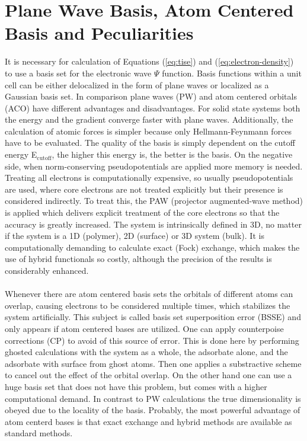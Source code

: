 \documentclass[11pt,DIV=13,BCOR=5mm,a4paper,headinclude]{scrbook}
\begin{document}
\section{Plane Wave Basis, Atom Centered Basis and Peculiarities}
It is necessary for calculation of Equations (\ref{eq:tise}) and (\ref{eq:electron-density}) to use a basis set for the electronic wave $\Psi$ function.
Basis functions within a unit cell can be either delocalized in the form of plane waves or localized as a Gaussian basis set.
In comparison plane waves (PW) and atom centered orbitals (ACO) have different advantages and disadvantages\cite{Tosoni2007}.
For solid state systems both the energy and the gradient converge faster with plane waves.
Additionally, the calculation of atomic forces is simpler because only Hellmann-Feynmann forces have to be evaluated.
The quality of the basis is simply dependent on the cutoff energy E$_\textrm{cutoff}$, the higher this energy is, the better is the basis.
On the negative side, when norm-conserving pseudopotentials are applied more memory is needed.
Treating all electrons is computationally expensive, so usually pseudopotentials are used, where core electrons are not treated explicitly but their presence is considered indirectly.
To treat this, the PAW\cite{paw1,Kresse1999} (projector augmented-wave method) is applied which delivers explicit treatment of the core electrons so that the accuracy is greatly increased.
The system is intrinsically defined in 3D, no matter if the system is a 1D (polymer), 2D (surface) or 3D system (bulk).
It is computationally demanding to calculate exact (Fock) exchange, which makes the use of hybrid functionals so costly, although the precision of the results is considerably enhanced.
\\\\
Whenever there are atom centered basis sets the orbitals of different atoms can overlap, causing electrons to be considered multiple times, which stabilizes the system artificially.
This subject is called basis set superposition error (BSSE) and only appears if atom centered bases are utilized.
One can apply counterpoise corrections (CP)\cite{Boys1970} to avoid of this source of error.
This is done here by performing ghosted calculations with the system as a whole, the adsorbate alone, and the adsorbate with surface from ghost atoms.
Then one applies a substractive scheme to cancel out the effect of the orbital overlap.
On the other hand one can use a huge basis set that does not have this problem, but comes with a higher computational demand.
In contrast to PW calculations the true dimensionality is obeyed due to the locality of the basis.
Probably, the most powerful advantage of atom centerd bases is that exact exchange and hybrid methods are available as standard methods.
\end{document}

